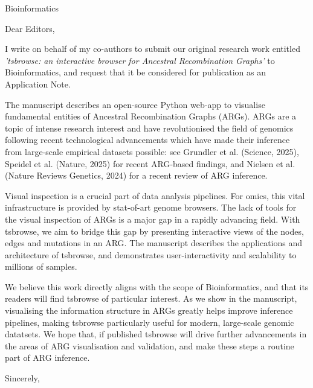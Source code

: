 \documentclass{letter}
\begin{document}
\begin{letter}{Bioinformatics}

    \opening{Dear Editors,}

    I write on behalf of my co-authors to submit our original research work
    entitled
    \emph{'tsbrowse: an interactive browser for Ancestral Recombination
        Graphs'} to
    Bioinformatics,
    and request that it be considered for publication as an Application Note.

    The manuscript describes an open-source Python web-app to visualise
    fundamental
    entities
    of Ancestral Recombination Graphs (ARGs). ARGs are a topic of intense
    research
    interest and
    have revolutionised the field of genomics following recent technological
    advancements
    which have made their inference from large-scale empirical datasets
    possible: see Grundler et al. (Science, 2025), Speidel et al. (Nature,
    2025)
    for recent ARG-based findings, and Nielsen et al. (Nature Reviews Genetics,
    2024) for a recent review of ARG inference.
    
    Visual inspection is a crucial part of data analysis pipelines. For omics,
    this
    vital
    infrastructure is provided by stat-of-art genome browsers. The lack of
    tools
    for the
    visual inspection of ARGs is a major gap in a rapidly advancing field. With
    tsbrowse,
    we aim to bridge this gap by presenting interactive views of the nodes,
    edges
    and mutations
    in an ARG. The manuscript describes the applications and architecture of
    tsbrowse, and
    demonstrates user-interactivity and scalability to millions of samples.

    We believe this work directly aligns with the scope of Bioinformatics, and
    that
    its
    readers will find tsbrowse of particular interest. As we show in the
    manuscript, visualising
    the information structure in ARGs greatly helps improve inference
    pipelines,
    making tsbrowse
    particularly useful for modern, large-scale genomic datatsets. We hope
    that, if
    published
    tsbrowse will drive further advancements in the areas of ARG visualisation
    and
    validation,
    and make these steps a routine part of ARG inference.

    \closing{Sincerely,}

\end{letter}
\end{document}
